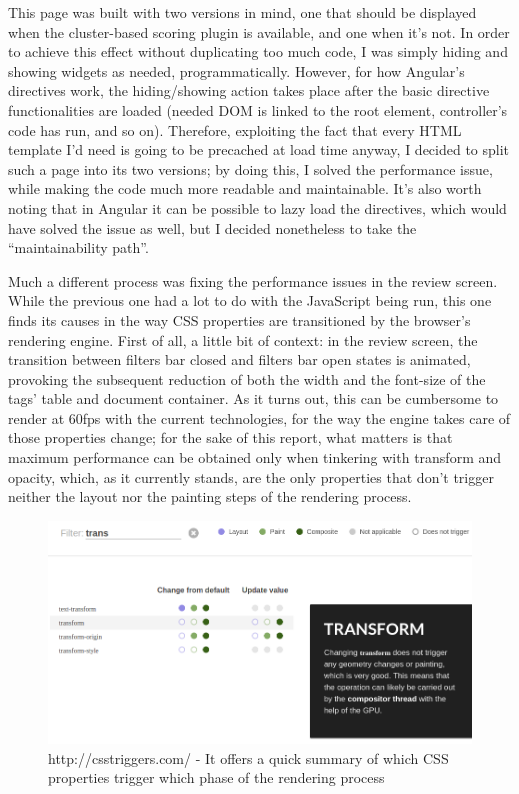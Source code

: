 \documentclass[12pt,oneside,svgnames]{memoir}
\begin{document}
This page was built with two versions in mind, one that should be
displayed when the cluster-based scoring plugin is available, and one
when it's not. In order to achieve this effect without duplicating too
much code, I was simply hiding and showing widgets as needed,
programmatically. However, for how Angular's directives work, the
hiding/showing action takes place after the basic directive
functionalities are loaded (needed DOM is linked to the root element,
controller's code has run, and so on). Therefore, exploiting the fact
that every HTML template I'd need is going to be precached at load time
anyway, I decided to split such a page into its two versions; by doing
this, I solved the performance issue, while making the code much more
readable and maintainable. It's also worth noting that in Angular it can
be possible to lazy load the directives, which would have solved the
issue as well, but I decided nonetheless to take the ``maintainability
path''.

Much a different process was fixing the performance issues in the review
screen. While the previous one had a lot to do with the JavaScript being
run, this one finds its causes in the way CSS properties are
transitioned by the browser's rendering engine. First of all, a little
bit of context: in the review screen, the transition between filters bar
closed and filters bar open states is animated, provoking the subsequent
reduction of both the width and the font-size of the tags' table and
document container. As it turns out, this can be cumbersome to render at
60fps with the current technologies, for the way the engine takes care
of those properties change; for the sake of this report, what matters is
that maximum performance can be obtained only when tinkering with
transform and opacity, which, as it currently stands, are the only
properties that don't trigger neither the layout nor the painting steps
of the rendering process.

\begin{figure}[htbp]
\centering
\includegraphics{./src/img/csstriggers.png}
\caption{http://csstriggers.com/ - It offers a quick summary of which
CSS properties trigger which phase of the rendering process}
\end{figure}
\end{document}
